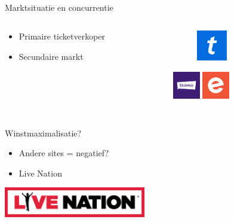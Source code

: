 \documentclass{beamer}
\begin{document}
    \subsection{}
    \begin{frame}{Marktsituatie en concurrentie}
        \begin{columns}
            \begin{column}{.4\textwidth}
                \begin{itemize}
                    \item Primaire ticketverkoper
                    \item Secundaire markt
                \end{itemize}
            \end{column}
            \begin{column}{.6\textwidth}
                \begin{figure}
                    \includegraphics[width=50px,height=50px,keepaspectratio]{ticketmaster-logo.png}
                \end{figure}
                \centering
                \includegraphics[width=45px,height=45px,keepaspectratio]{stubhub-logo.png}
                \includegraphics[width=45px,height=45px,keepaspectratio]{eventbrite-logo.png}
            \end{column}
        \end{columns}
    \end{frame}
    
    \subsection{}
    \begin{frame}{Winstmaximalisatie?}
        \begin{itemize}
            \item Andere sites = negatief?
            \item Live Nation
        \end{itemize}
        \begin{center}
            \includegraphics[height=50px, keepaspectratio]{livenation_logo.png}
        \end{center}
    \end{frame}
\end{document}
